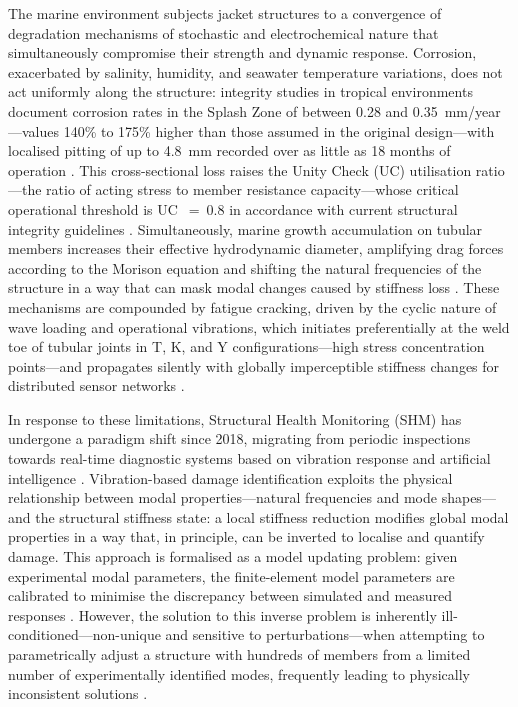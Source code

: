 \documentclass[a4paper,fleqn,nologo]{cas-dc}
\begin{document}
The marine environment subjects jacket structures to a convergence of degradation mechanisms of stochastic and electrochemical nature that simultaneously compromise their strength and dynamic response. Corrosion, exacerbated by salinity, humidity, and seawater temperature variations, does not act uniformly along the structure: integrity studies in tropical environments document corrosion rates in the Splash Zone of between 0.28 and 0.35~mm/year---values 140\% to 175\% higher than those assumed in the original design---with localised pitting of up to 4.8~mm recorded over as little as 18 months of operation \citep{birci2020integrity}. This cross-sectional loss raises the Unity Check (UC) utilisation ratio---the ratio of acting stress to member resistance capacity---whose critical operational threshold is UC~$=~0.8$ in accordance with current structural integrity guidelines \citep{API2014_manual, salama2020shm}. Simultaneously, marine growth accumulation on tubular members increases their effective hydrodynamic diameter, amplifying drag forces according to the Morison equation and shifting the natural frequencies of the structure in a way that can mask modal changes caused by stiffness loss \citep{salama2020shm}. These mechanisms are compounded by fatigue cracking, driven by the cyclic nature of wave loading and operational vibrations, which initiates preferentially at the weld toe of tubular joints in T, K, and Y configurations---high stress concentration points---and propagates silently with globally imperceptible stiffness changes for distributed sensor networks \citep{raza2021fatigue}.

In response to these limitations, Structural Health Monitoring (SHM) has undergone a paradigm shift since 2018, migrating from periodic inspections towards real-time diagnostic systems based on vibration response and artificial intelligence \citep{ghsoub2018structural, mdpi2024shm_wind}. Vibration-based damage identification exploits the physical relationship between modal properties---natural frequencies and mode shapes---and the structural stiffness state: a local stiffness reduction modifies global modal properties in a way that, in principle, can be inverted to localise and quantify damage. This approach is formalised as a model updating problem: given experimental modal parameters, the finite-element model parameters are calibrated to minimise the discrepancy between simulated and measured responses \citep{doebling1996damage}. However, the solution to this inverse problem is inherently ill-conditioned---non-unique and sensitive to perturbations---when attempting to parametrically adjust a structure with hundreds of members from a limited number of experimentally identified modes, frequently leading to physically inconsistent solutions \citep{aghaeidoost2023generalized}.
\end{document}

